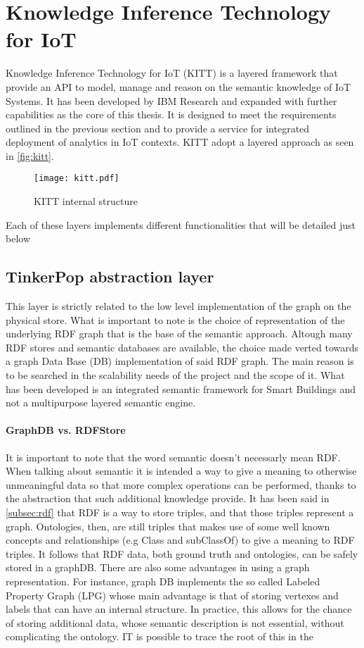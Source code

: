 \section{Knowledge Inference Technology for IoT}
Knowledge Inference Technology for IoT (KITT) is a layered framework that provide an API to model, manage and reason on the semantic knowledge of IoT Systems. It has been developed by IBM Research and expanded with further capabilities as the core of this thesis. It is designed to meet the requirements outlined in the previous section and to provide a service for integrated deployment of analytics in IoT contexts.
KITT adopt a layered approach as seen in \autoref{fig:kitt}.
\begin{figure}
  \centering
  \texttt{[image: kitt.pdf]}
  \caption{KITT internal structure}
  \label{fig:kitt}
\end{figure}
Each of these layers implements different functionalities that will be detailed just below

\subsection{TinkerPop abstraction layer}
This layer is strictly related to the low level implementation of the graph on the physical store. What is important to note is the choice of representation of the underlying RDF graph that is the base of the semantic approach. Altough many RDF stores and semantic databases are available, the choice made verted towards a graph Data Base (DB) implementation of said RDF graph. The main reason is to be searched in the scalability needs of the project and the scope of it. What has been developed is an integrated semantic framework for Smart Buildings and not a multipurpose layered semantic engine.
\paragraph{GraphDB vs. RDFStore}
It is important to note that the word semantic doesn't necessarly mean RDF. When talking about semantic it is intended a way to give a meaning to otherwise unmeaningful data so that more complex operations can be performed, thanks to the abstraction that such additional knowledge provide. It has been said in \autoref{subsec:rdf} that RDF is a way to store triples, and that those triples represent a graph. Ontologies, then, are still triples that makes use of some well known concepts and relationships (e.g Class and subClassOf) to give a meaning to RDF triples. It follows that RDF data, both ground truth and ontologies, can be safely stored in a graphDB. There are also some advantages in using a graph representation. For instance, graph DB implements the so called Labeled Property Graph (LPG) whose main advantage is that of storing vertexes and labels that can have an internal structure. In practice, this allows for the chance of storing additional data, whose semantic description is not essential, without complicating the ontology. IT is possible to trace the root of this in the
